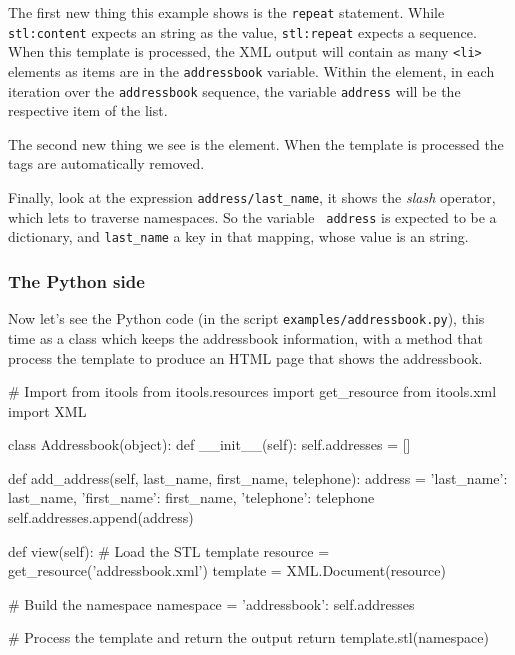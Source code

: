 The first new thing this example shows is the {\tt repeat} statement. While
{\tt stl:content} expects an string as the value, {\tt stl:repeat} expects
a sequence. When this template is processed, the XML output will contain as
many {\tt <li>} elements as items are in the {\tt addressbook} variable.
Within the element, in each iteration over the {\tt addressbook} sequence,
the variable {\tt address} will be the respective item of the list.

The second new thing we see is the {\tt <stl:block>} element. When the
template is processed the {\tt <stl:block>} tags are automatically
removed.

Finally, look at the expression {\tt address/last\_name}, it shows the {\em
slash} operator, which lets to traverse namespaces. So the variable {\tt
address} is expected to be a dictionary, and {\tt last\_name} a key in that
mapping, whose value is an string.

\subsubsection{The Python side}

Now let's see the Python code (in the script {\tt examples/addressbook.py}),
this time as a class which keeps the addressbook information, with a method
that process the template to produce an HTML page that shows the addressbook.

\begin{code}
    # Import from itools
    from itools.resources import get_resource
    from itools.xml import XML


    class Addressbook(object):
        def __init__(self):
            self.addresses = []


        def add_address(self, last_name, first_name, telephone):
            address = {'last_name': last_name,
                       'first_name': first_name,
                       'telephone': telephone}
            self.addresses.append(address)


        def view(self):
            # Load the STL template
            resource = get_resource('addressbook.xml')
            template = XML.Document(resource)

            # Build the namespace
            namespace = {'addressbook': self.addresses}

            # Process the template and return the output
            return template.stl(namespace)
\end{code}

